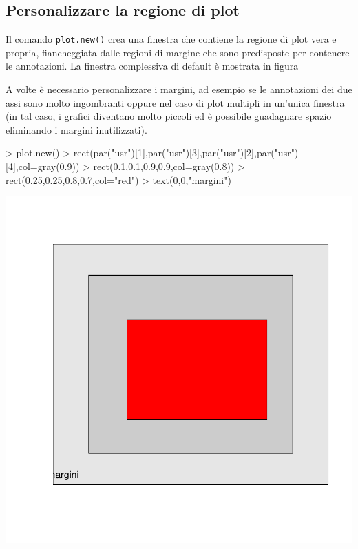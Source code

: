 \documentclass[onecolumn,11pt]{book}
\begin{document}
\subsection{Personalizzare la regione di plot}
Il comando \texttt{plot.new()} crea una finestra che contiene la regione di plot vera e propria, fiancheggiata dalle regioni di margine che sono predisposte per contenere le annotazioni. La finestra complessiva di default  \`e  mostrata in figura

A volte \`e necessario personalizzare i margini, ad esempio se le annotazioni dei due assi sono molto ingombranti oppure nel caso di plot multipli in un'unica finestra (in tal caso, i grafici diventano molto piccoli ed \`e possibile guadagnare spazio eliminando i margini inutilizzati). 

\begin{Schunk}
\begin{Sinput}
> plot.new()
> rect(par("usr")[1],par("usr")[3],par("usr")[2],par("usr")[4],col=gray(0.9))
> rect(0.1,0.1,0.9,0.9,col=gray(0.8))
> rect(0.25,0.25,0.8,0.7,col="red")
> text(0,0,"margini")
\end{Sinput}
\end{Schunk}
\includegraphics{statisticaconR-378}
\end{document}
